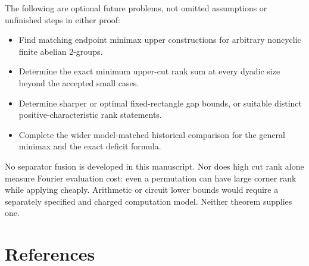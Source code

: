 \documentclass[
  11pt,
  letterpaper,
]{article}
\providecommand{\tightlist}{%
  \setlength{\itemsep}{0pt}\setlength{\parskip}{0pt}}
\begin{document}
The following are optional future problems, not omitted assumptions or
unfinished steps in either proof:

\begin{itemize}
\tightlist
\item
  Find matching endpoint minimax upper constructions for arbitrary
  noncyclic finite abelian \(2\)-groups.
\item
  Determine the exact minimum upper-cut rank sum at every dyadic size
  beyond the accepted small cases.
\item
  Determine sharper or optimal fixed-rectangle gap bounds, or suitable
  distinct positive-characteristic rank statements.
\item
  Complete the wider model-matched historical comparison for the general
  minimax and the exact deficit formula.
\end{itemize}

No separator fusion is developed in this manuscript. Nor does high cut
rank alone measure Fourier evaluation cost: even a permutation can have
large corner rank while applying cheaply. Arithmetic or circuit lower
bounds would require a separately specified and charged computation
model. Neither theorem supplies one.

\section{References}\label{references}
\end{document}
